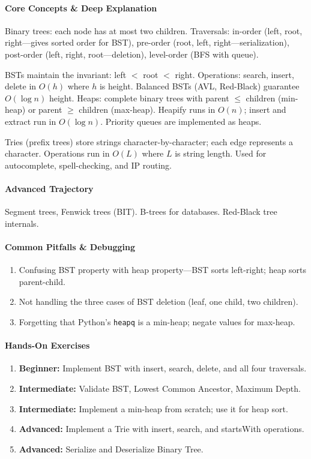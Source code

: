 \documentclass[11pt, a4paper, oneside]{report}
\begin{document}
\paragraph{Core Concepts \& Deep Explanation} Binary trees: each node has at most two children. Traversals: in-order (left, root, right---gives sorted order for BST), pre-order (root, left, right---serialization), post-order (left, right, root---deletion), level-order (BFS with queue).

BSTs maintain the invariant: left $<$ root $<$ right. Operations: search, insert, delete in $O(h)$ where $h$ is height. Balanced BSTs (AVL, Red-Black) guarantee $O(\log n)$ height. Heaps: complete binary trees with parent $\leq$ children (min-heap) or parent $\geq$ children (max-heap). Heapify runs in $O(n)$; insert and extract run in $O(\log n)$. Priority queues are implemented as heaps.

Tries (prefix trees) store strings character-by-character; each edge represents a character. Operations run in $O(L)$ where $L$ is string length. Used for autocomplete, spell-checking, and IP routing.

\paragraph{Advanced Trajectory} Segment trees, Fenwick trees (BIT). B-trees for databases. Red-Black tree internals.

\paragraph{Common Pitfalls \& Debugging}
\begin{enumerate}[leftmargin=*]
\item Confusing BST property with heap property---BST sorts left-right; heap sorts parent-child.
\item Not handling the three cases of BST deletion (leaf, one child, two children).
\item Forgetting that Python's \texttt{heapq} is a min-heap; negate values for max-heap.
\end{enumerate}

\paragraph{Hands-On Exercises}
\begin{enumerate}[leftmargin=*]
\item \textbf{Beginner:} Implement BST with insert, search, delete, and all four traversals.
\item \textbf{Intermediate:} Validate BST, Lowest Common Ancestor, Maximum Depth.
\item \textbf{Intermediate:} Implement a min-heap from scratch; use it for heap sort.
\item \textbf{Advanced:} Implement a Trie with insert, search, and startsWith operations.
\item \textbf{Advanced:} Serialize and Deserialize Binary Tree.
\end{enumerate}
\end{document}
